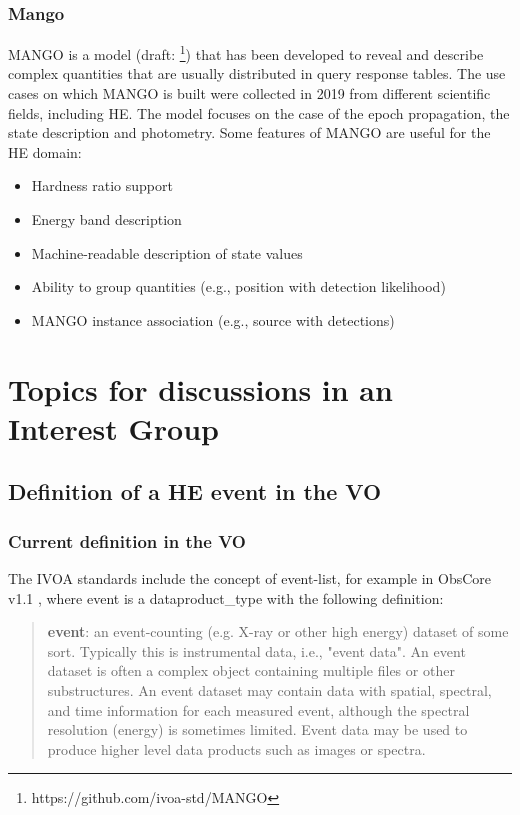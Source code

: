 \documentclass[11pt,a4paper]{ivoa}
\begin{document}
\subsubsection{Mango}
MANGO is a model (draft: \footnote{https://github.com/ivoa-std/MANGO}) that has been developed to reveal 
and describe complex quantities that are usually distributed in query response tables.
The use cases on which MANGO is built were collected in 2019 from different scientific fields, including HE.
The model focuses on the case of the epoch propagation, the state description
 and photometry. 
 Some features of MANGO are useful for the HE domain:
 
 \begin{itemize}[noitemsep,topsep=0pt,parsep=0pt,partopsep=0pt]
     \item Hardness ratio support
     \item Energy band description
     \item Machine-readable description of state values
     \item Ability to group quantities (e.g., position with detection likelihood)
     \item MANGO instance association (e.g., source with detections)  
\end{itemize} 

\section{Topics for discussions in an Interest Group}


\subsection{Definition of a HE event in the VO}
\label{sec:event-bundlle-or-list}

\subsubsection{Current definition in the VO}

The IVOA standards include the concept of event-list, for example in ObsCore v1.1 \citep{2017ivoa.spec.0509L}, where
event is a dataproduct\_type with the following definition:
\begin{quote}
    \textbf{event}: an event-counting (e.g. X-ray or other high energy) dataset of some sort. Typically this is
    instrumental data, i.e., "event data". An event dataset is often a complex object containing multiple files or
    other substructures. An event dataset may contain data with spatial, spectral, and time information for each
    measured event, although the spectral resolution (energy) is sometimes limited. Event data may be used to produce
    higher level data products such as images or spectra.
\end{quote}
\end{document}
